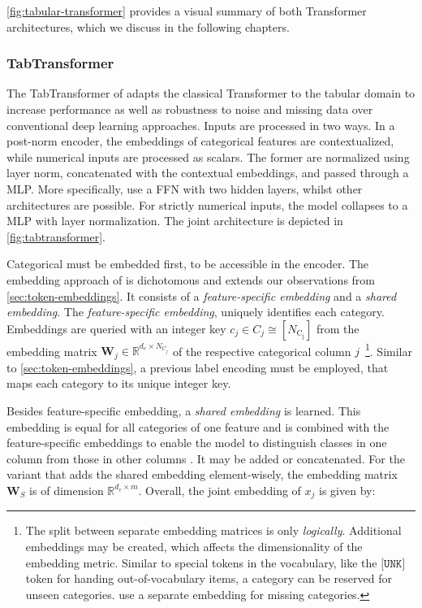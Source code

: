 \cref{fig:tabular-transformer} provides a visual summary of both Transformer architectures, which we discuss in the following chapters.

\subsubsection{TabTransformer}\label{sec:tabtransformer}

The TabTransformer of \textcite[][4]{huangTabTransformerTabularData2020} adapts the classical Transformer to the tabular domain to increase performance as well as robustness to noise and missing data over conventional deep learning approaches. Inputs are processed in two ways. In a post-norm encoder, the embeddings of categorical features are contextualized, while numerical inputs are processed as scalars. The former are normalized using layer norm, concatenated with the contextual embeddings, and passed through a \gls{MLP}. More specifically, \textcite[][4--12]{huangTabTransformerTabularData2020} use a \gls{FFN} with two hidden layers, whilst other architectures are possible. For strictly numerical inputs, the model collapses to a \gls{MLP} with layer normalization. The joint architecture is depicted in \cref{fig:tabtransformer}.

Categorical must be embedded first, to be accessible in the encoder. The embedding approach of \textcite[][3]{huangTabTransformerTabularData2020} is dichotomous and extends our observations from \cref{sec:token-embeddings}. It consists of a \emph{feature-specific embedding} and a \emph{shared embedding}. The \emph{feature-specific embedding}, uniquely identifies each category. Embeddings are queried with an integer key $c_j \in C_j \cong\left[N_{\mathrm{C_j}}\right]$ from the embedding matrix $\boldsymbol{W}_j \in \mathbb{R}^{d_e \times N_{C_j}}$ of the respective categorical column $j$~\footnote{The split between separate embedding matrices is only \emph{logically}. Additional embeddings may be created, which affects the dimensionality of the embedding metric. Similar to special tokens in the vocabulary, like the $\texttt{[UNK]}$ token for handing out-of-vocabulary items, a category can be reserved for unseen categories. \textcite[][10]{huangTabTransformerTabularData2020} use a separate embedding for missing categories.}. Similar to \cref{sec:token-embeddings}, a previous label encoding must be employed, that maps each category to its unique integer key.

Besides feature-specific embedding, a \emph{shared embedding} is learned. This embedding is equal for all categories of one feature and is combined with the feature-specific embeddings to enable the model to distinguish classes in one column from those in other columns \autocite[][10]{huangTabTransformerTabularData2020}. It may be added or concatenated. For the variant that adds the shared embedding element-wisely, the embedding matrix $\boldsymbol{W}_S$ is of dimension $\mathbb{R}^{d_e \times m}$. Overall, the joint embedding of $x_j$ is given by:

